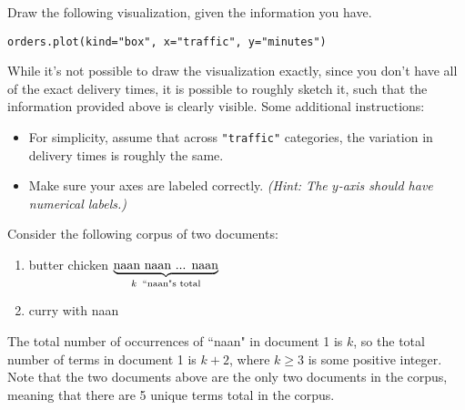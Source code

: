 \documentclass[twoside,12pt]{article}
\begin{document}
\begin{probset}
\begin{prob}[(4 pts)]
Draw the following visualization, given the information you have.

\begin{verbatim}
orders.plot(kind="box", x="traffic", y="minutes")
\end{verbatim}

While it's not possible to draw the visualization exactly, since you don't have all of the exact delivery times, it is possible to roughly sketch it, such that the information provided above is clearly visible. Some additional instructions:
\begin{itemize}
    \item For simplicity, assume that across \texttt{"traffic"} categories, the variation in delivery times is roughly the same.
    \item Make sure your axes are labeled correctly. \textit{(Hint: The $y$-axis should have numerical labels.)}
\end{itemize}

\begin{responsebox}{4in}
    
\end{responsebox}

\end{prob}

\newpage




\newpage

\begin{prob}[(10 pts)]

Consider the following corpus of two documents:

\begin{enumerate}
    \item butter chicken $\underbrace{\text{naan naan ... naan}}_{k \text{\: ``naan"s total}}$
    \item curry with naan
\end{enumerate}

The total number of occurrences of ``naan" in document 1 is $k$, so the total number of terms in document 1 is $k + 2$, where $k \geq 3$ is some positive integer. Note that the two documents above are the only two documents in the corpus, meaning that there are 5 unique terms total in the corpus.


\end{prob}
\end{probset}
\end{document}
